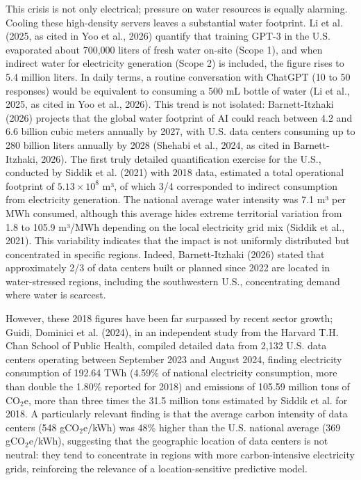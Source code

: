 \documentclass[conference]{IEEEtran}
\begin{document}
This crisis is not only electrical; pressure on water resources is equally alarming. Cooling these high-density servers leaves a substantial water footprint. Li et al. (2025, as cited in Yoo et al., 2026) quantify that training GPT-3 in the U.S. evaporated about 700,000 liters of fresh water on-site (Scope 1), and when indirect water for electricity generation (Scope 2) is included, the figure rises to 5.4 million liters. In daily terms, a routine conversation with ChatGPT (10 to 50 responses) would be equivalent to consuming a 500 mL bottle of water (Li et al., 2025, as cited in Yoo et al., 2026). This trend is not isolated: Barnett-Itzhaki (2026) projects that the global water footprint of AI could reach between 4.2 and 6.6 billion cubic meters annually by 2027, with U.S. data centers consuming up to 280 billion liters annually by 2028 (Shehabi et al., 2024, as cited in Barnett-Itzhaki, 2026). The first truly detailed quantification exercise for the U.S., conducted by Siddik et al. (2021) with 2018 data, estimated a total operational footprint of $5.13 \times 10^8$ m³, of which 3/4 corresponded to indirect consumption from electricity generation. The national average water intensity was 7.1 m³ per MWh consumed, although this average hides extreme territorial variation from 1.8 to 105.9 m³/MWh depending on the local electricity grid mix (Siddik et al., 2021). This variability indicates that the impact is not uniformly distributed but concentrated in specific regions. Indeed, Barnett-Itzhaki (2026) stated that approximately 2/3 of data centers built or planned since 2022 are located in water-stressed regions, including the southwestern U.S., concentrating demand where water is scarcest.

However, these 2018 figures have been far surpassed by recent sector growth; Guidi, Dominici et al. (2024), in an independent study from the Harvard T.H. Chan School of Public Health, compiled detailed data from 2,132 U.S. data centers operating between September 2023 and August 2024, finding electricity consumption of 192.64 TWh (4.59\% of national electricity consumption, more than double the 1.80\% reported for 2018) and emissions of 105.59 million tons of CO$_2$e, more than three times the 31.5 million tons estimated by Siddik et al. for 2018. A particularly relevant finding is that the average carbon intensity of data centers (548 gCO$_2$e/kWh) was 48\% higher than the U.S. national average (369 gCO$_2$e/kWh), suggesting that the geographic location of data centers is not neutral: they tend to concentrate in regions with more carbon-intensive electricity grids, reinforcing the relevance of a location-sensitive predictive model.
\end{document}
